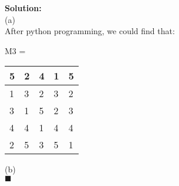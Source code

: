 \documentclass{article}
\newenvironment{solution}                               %
{\textbf{Solution:} \\}{$\blacksquare$\newline}         %
\begin{document}
    \begin{solution}
        (a) \\
        After python programming, we could find that:
        \begin{center}
            M3 = 
            \begin{tabular}{|l|l|l|l|l|}
                \hline 5 & 2 & 4 & 1 & 5 \\
                \hline 1 & 3 & 2 & 3 & 2 \\
                \hline 3 & 1 & 5 & 2 & 3 \\
                \hline 4 & 4 & 1 & 4 & 4 \\
                \hline 2 & 5 & 3 & 5 & 1 \\
                \hline
            \end{tabular}
        \end{center}

        (b) \\

    \end{solution}
\end{document}
